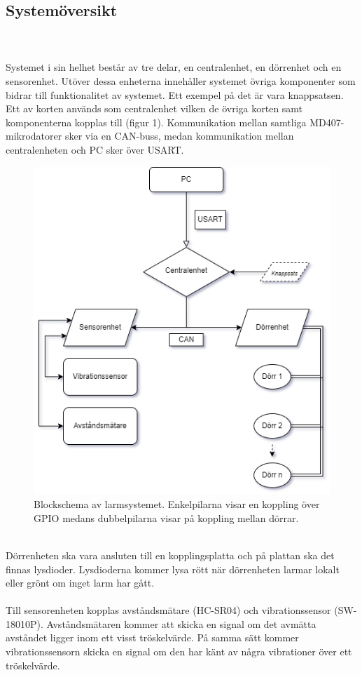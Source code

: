 \documentclass{article}
\begin{document}
\newpage
\subsection{Systemöversikt}

\\
\\
\noindent
Systemet i sin helhet består av tre delar, en centralenhet, en dörrenhet och en sensorenhet. 
Utöver dessa enheterna innehåller systemet övriga komponenter som bidrar till funktionalitet av systemet. 
Ett exempel på det är vara knappsatsen.
Ett av korten används som centralenhet vilken de övriga korten samt komponenterna kopplas till (figur 1). 
Kommunikation mellan samtliga MD407-mikrodatorer sker via en CAN-buss, medan kommunikation mellan centralenheten och PC sker över USART.
\\
\begin{figure}[h]
    \centering
    \includegraphics[scale=0.6]{Projektrapport/diagram (1).png}
     \caption {Blockschema av larmsystemet. Enkelpilarna visar en koppling över GPIO medans dubbelpilarna visar på koppling mellan dörrar.}
    \label{fig:drawing}
\end{figure}
\newpage
\\
\noindent
Dörrenheten ska vara ansluten till en kopplingsplatta och på plattan ska det finnas lysdioder.
Lysdioderna kommer lysa rött när dörrenheten larmar lokalt eller grönt om inget larm har gått.
\\
\\
Till sensorenheten kopplas avståndsmätare (HC-SR04) och vibrationssensor (SW-18010P).
Avståndsmätaren kommer att skicka en signal om det avmätta avståndet ligger inom ett visst tröskelvärde.
På samma sätt kommer vibrationssensorn skicka en signal om den har känt av några vibrationer över ett tröskelvärde.
\end{document}

